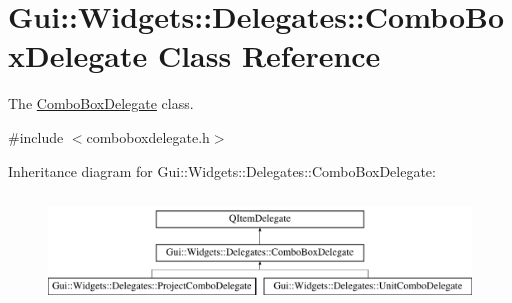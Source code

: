 \hypertarget{classGui_1_1Widgets_1_1Delegates_1_1ComboBoxDelegate}{\section{Gui\-:\-:Widgets\-:\-:Delegates\-:\-:Combo\-Box\-Delegate Class Reference}
\label{classGui_1_1Widgets_1_1Delegates_1_1ComboBoxDelegate}
}


The \hyperlink{classGui_1_1Widgets_1_1Delegates_1_1ComboBoxDelegate}{Combo\-Box\-Delegate} class.  




{\ttfamily \#include $<$comboboxdelegate.\-h$>$}

Inheritance diagram for Gui\-:\-:Widgets\-:\-:Delegates\-:\-:Combo\-Box\-Delegate\-:\begin{figure}[H]
\begin{center}
\leavevmode
\includegraphics[height=2.937063cm]{d5/d72/classGui_1_1Widgets_1_1Delegates_1_1ComboBoxDelegate}
\end{center}
\end{figure}
